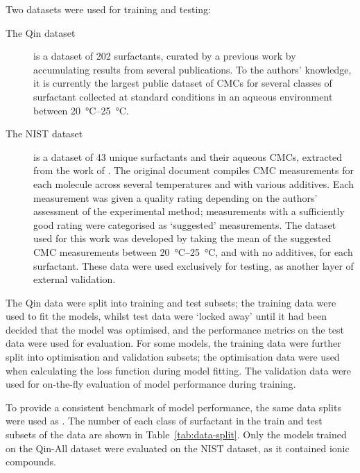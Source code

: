 \newcommand{\lrv}{\vec{v}^{\,(p)}}

Two datasets were used for training and testing:

\begin{description}
    \item[The Qin dataset] is a dataset of 202 surfactants, curated by a
          previous work \cite{qinPredictingCriticalMicelle2021} by accumulating
          results from several publications. To the authors' knowledge, it is
          currently the largest public dataset of CMCs for several classes of
          surfactant collected at standard conditions in an aqueous environment
          between \SIrange{20}{25}{\celsius}.
    \item[The NIST dataset] is a dataset of 43 unique surfactants and their
          aqueous CMCs, extracted from the work of
          \citet{mukerjeeCriticalMicelleConcentrations1971}. The original
          document compiles CMC measurements for each molecule across several
          temperatures and with various additives. Each measurement was given a
          quality rating depending on the authors' assessment of the
          experimental method; measurements with a sufficiently good rating were
          categorised as `suggested' measurements. The dataset used for this
          work was developed by taking the mean of the suggested CMC
          measurements between \SIrange{20}{25}{\degreeCelsius}, and with no
          additives, for each surfactant. These data were used exclusively for
          testing, as another layer of external validation.
\end{description}

The Qin data \cite{qinPredictingCriticalMicelle2021} were split into training
and test subsets; the training data were used to fit the models, whilst test
data were `locked away' until it had been decided that the model was optimised,
and the performance metrics on the test data were used for evaluation. For some
models, the training data were further split into optimisation and validation
subsets; the optimisation data were used when calculating the loss function
during model fitting. The validation data were used for on-the-fly evaluation of
model performance during training.

To provide a consistent benchmark of model performance, the same data splits were used as \citet{qinPredictingCriticalMicelle2021}. The number of each class of surfactant in the train and test subsets of the data are shown in Table~\ref{tab:data-split}. Only the models trained on the Qin-All dataset were evaluated on the NIST dataset, as it contained ionic compounds.

